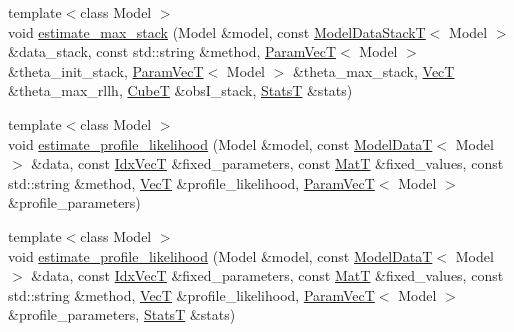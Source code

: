 \begin{DoxyCompactItemize}
\item 
{\footnotesize template$<$class Model $>$ }\\void \hyperlink{namespacemappel_1_1methods_1_1openmp_a642f8ea143c84ec414410596fd6911bb}{estimate\+\_\+max\+\_\+stack} (Model \&model, const \hyperlink{namespacemappel_aaeb6665bc57476dd93c2df6ad8bc4768}{Model\+Data\+StackT}$<$ Model $>$ \&data\+\_\+stack, const std\+::string \&method, \hyperlink{namespacemappel_a0f86d3153e4e27b095012f140eea58de}{Param\+VecT}$<$ Model $>$ \&theta\+\_\+init\+\_\+stack, \hyperlink{namespacemappel_a0f86d3153e4e27b095012f140eea58de}{Param\+VecT}$<$ Model $>$ \&theta\+\_\+max\+\_\+stack, \hyperlink{namespacemappel_a2225ad69f358daa3f4f99282a35b9a3a}{VecT} \&theta\+\_\+max\+\_\+rllh, \hyperlink{namespacemappel_ab2afab4e6c8805e83946670d882768c2}{CubeT} \&obs\+I\+\_\+stack, \hyperlink{namespacemappel_a04ab395b0cf82c4ce68a36b2212649a5}{StatsT} \&stats)
\item 
{\footnotesize template$<$class Model $>$ }\\void \hyperlink{namespacemappel_1_1methods_1_1openmp_a22579301b567235e0f8394de0e499347}{estimate\+\_\+profile\+\_\+likelihood} (Model \&model, const \hyperlink{namespacemappel_a97f050df953605381ae9c901c3b125f1}{Model\+DataT}$<$ Model $>$ \&data, const \hyperlink{namespacemappel_ac63743dcd42180127307cd0e4ecdd784}{Idx\+VecT} \&fixed\+\_\+parameters, const \hyperlink{namespacemappel_a7091ab87c528041f7e2027195fad8915}{MatT} \&fixed\+\_\+values, const std\+::string \&method, \hyperlink{namespacemappel_a2225ad69f358daa3f4f99282a35b9a3a}{VecT} \&profile\+\_\+likelihood, \hyperlink{namespacemappel_a0f86d3153e4e27b095012f140eea58de}{Param\+VecT}$<$ Model $>$ \&profile\+\_\+parameters)
\item 
{\footnotesize template$<$class Model $>$ }\\void \hyperlink{namespacemappel_1_1methods_1_1openmp_a73674d78246aaf6315dc772f88c176be}{estimate\+\_\+profile\+\_\+likelihood} (Model \&model, const \hyperlink{namespacemappel_a97f050df953605381ae9c901c3b125f1}{Model\+DataT}$<$ Model $>$ \&data, const \hyperlink{namespacemappel_ac63743dcd42180127307cd0e4ecdd784}{Idx\+VecT} \&fixed\+\_\+parameters, const \hyperlink{namespacemappel_a7091ab87c528041f7e2027195fad8915}{MatT} \&fixed\+\_\+values, const std\+::string \&method, \hyperlink{namespacemappel_a2225ad69f358daa3f4f99282a35b9a3a}{VecT} \&profile\+\_\+likelihood, \hyperlink{namespacemappel_a0f86d3153e4e27b095012f140eea58de}{Param\+VecT}$<$ Model $>$ \&profile\+\_\+parameters, \hyperlink{namespacemappel_a04ab395b0cf82c4ce68a36b2212649a5}{StatsT} \&stats)

\end{DoxyCompactItemize}
